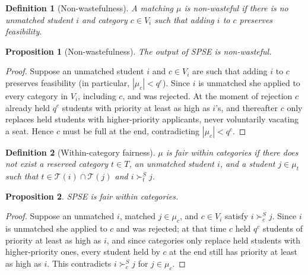 \documentclass[10pt]{article}
\newtheorem{definition}{Definition}
\newtheorem{proposition}{Proposition}
\newcommand{\T}{\mathcal{T}}
\newcommand{\1}{\mathbf{1}}
\begin{document}
\begin{definition}[Non-wastefulness]
A matching $\mu$ is non-wasteful if there is no unmatched student $i$ and category $c\in V_i$ such that adding $i$ to $c$ preserves feasibility.
\end{definition}

\begin{proposition}[Non-wastefulness]\label{prop:nonwastefulness}
The output of SPSE is non-wasteful.
\end{proposition}
\begin{proof}
Suppose an unmatched student $i$ and $c\in V_i$ are such that adding $i$ to $c$ preserves feasibility (in particular, $|\mu_c|<q^c$). Since $i$ is unmatched she applied to every category in $V_i$, including $c$, and was rejected. At the moment of rejection $c$ already held $q^c$ students with priority at least as high as $i$'s, and thereafter $c$ only replaces held students with higher-priority applicants, never voluntarily vacating a seat. Hence $c$ must be full at the end, contradicting $|\mu_c|<q^c$.
\end{proof}

\begin{definition}[Within-category fairness]
$\mu$ is fair within categories if there does not exist a reserved category $t\in T$, an unmatched student $i$, and a student $j\in\mu_t$ such that $t\in \T(i)\cap\T(j)$ and $i\succ_t^S j$.
\end{definition}

\begin{proposition}\label{prop:within-category-fairness}
SPSE is fair within categories.
\end{proposition}
\begin{proof}
Suppose an unmatched $i$, matched $j\in\mu_c$, and $c\in V_i$ satisfy $i\succ_c^S j$. Since $i$ is unmatched she applied to $c$ and was rejected; at that time $c$ held $q^c$ students of priority at least as high as $i$, and since categories only replace held students with higher-priority ones, every student held by $c$ at the end still has priority at least as high as $i$. This contradicts $i\succ_c^S j$ for $j\in\mu_c$.
\end{proof}
\end{document}

